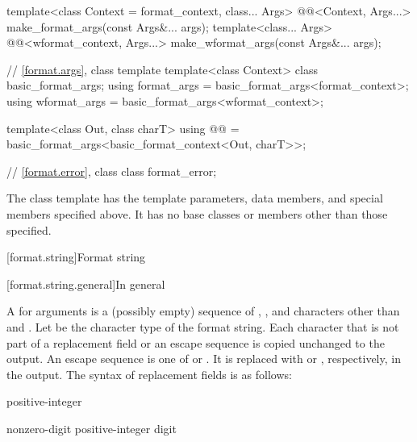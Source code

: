 \begin{codeblock}
{  template<class Context = format_context, class... Args>
    @@<Context, Args...>
      make_format_args(const Args&... args);
  template<class... Args>
    @@<wformat_context, Args...>
      make_wformat_args(const Args&... args);

  // \ref{format.args}, class template 
  template<class Context> class basic_format_args;
  using format_args = basic_format_args<format_context>;
  using wformat_args = basic_format_args<wformat_context>;

  template<class Out, class charT>
    using @@ = basic_format_args<basic_format_context<Out, charT>>;

  // \ref{format.error}, class 
  class format_error;
}
\end{codeblock}


\pnum
The class template 
has the template parameters, data members, and special members specified above. It has no base classes or members other than those specified.

[format.string]{Format string}

[format.string.general]{In general}

\pnum
A  for arguments  is
a (possibly empty) sequence of
,
,
and characters other than \tcode{\{} and \tcode{\}}.
Let  be the character type of the format string.
Each character that is not part of
a replacement field or an escape sequence
is copied unchanged to the output.
An escape sequence is one of \tcode{\{\{} or \tcode{\}\}}.
It is replaced with \tcode{\{} or \tcode{\}}, respectively, in the output.
The syntax of replacement fields is as follows:

\begin{ncbnf}
\br
    \terminal{\{}   \terminal{\}}
\end{ncbnf}

\begin{ncbnf}
\br
    \br
    positive-integer
\end{ncbnf}

\begin{ncbnf}
\br
    nonzero-digit\br
    positive-integer digit
\end{ncbnf}

